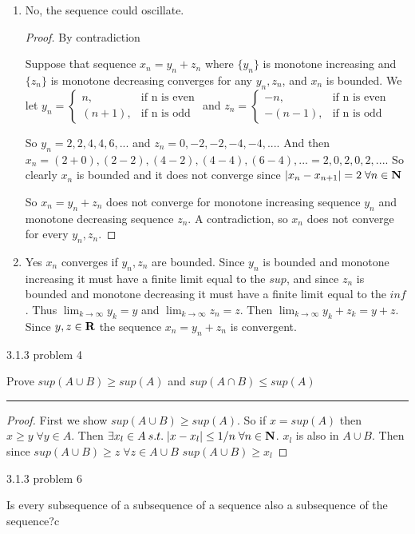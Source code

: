 \documentclass[11pt]{article}
\begin{document}
\begin{enumerate}
	\item No, the sequence could oscillate.
	
	\begin{proof} By contradiction
	
	Suppose that sequence $x_n = y_n + z_n$ where $\{y_n\}$ is monotone increasing and $\{z_n\}$ is monotone decreasing converges for any $y_n, z_n$, and $x_n$ is bounded. We let 
	$y_n = \begin{cases}
	n, & \text{if n is even}\\
	(n+1), & \text{if n is odd}
	\end{cases}$ and 
	$z_n = \begin{cases}
	-n, & \text{if n is even}\\
	-(n-1), & \text{if n is odd}
	\end{cases}$
	
	So $y_n = 2, 2, 4, 4, 6, ...$ and $z_n = 0, -2, -2, -4, -4,... $. And then 
	$x_n = (2 + 0), (2 -2), (4 -2), (4 - 4), (6-4), ... = 2, 0, 2, 0, 2, ...$. 
	So clearly $x_n$ is bounded and it does not converge since 
	$|x_n - x_{n+1}| = 2 \; 	\forall n\in \mathbf{N}$
	
	So $x_n = y_n + z_n$ does not converge for monotone increasing sequence $y_n$ 
	and monotone decreasing sequence $z_n$. 
	A contradiction, so $x_n$ does not converge for every $y_n, z_n$.
	\end{proof}	 
	
	\item Yes $x_n$ converges if $y_n, z_n$ are bounded. 
	Since $y_n$ is bounded and monotone increasing it must have a finite limit equal to the $sup$, 
	and since $z_n$ is bounded and monotone decreasing it must have a finite limit equal to the $inf$. 
	Thus $\lim_{k \to \infty} y_k = y$ and $\lim_{k \to \infty} z_n = z$.
	Then $\lim_{k \to \infty} y_k + z_k = y + z$.
	Since $y, z \in \mathbf{R}$ the sequence $x_n = y_n + z_n$ is convergent.
		
	
\end{enumerate}


	


\newpage
{} 3.1.3 problem 4

Prove $sup(A \cup B) \geq sup (A)$ and $sup(A\cap B) \leq sup(A)$

\hrule

\begin{proof}

First we show $sup(A \cup B) \geq sup (A)$. So if $x = sup(A)$ then $x \geq y \; \forall y \in A$.  Then $\exists x_l \in A \: s.t. \; |x - x_l| \leq 1/n \; \forall n \in \mathbf{N}$. $x_l$ is also in $A \cup B$. Then since $sup(A\cup B) \geq z \; \forall z \in A \cup B$ $sup(A \cup B) \geq x_l$

\end{proof}








\newpage
{} 3.1.3 problem 6

Is every subsequence of a subsequence of a sequence also a subsequence of the sequence?c
\end{document}
